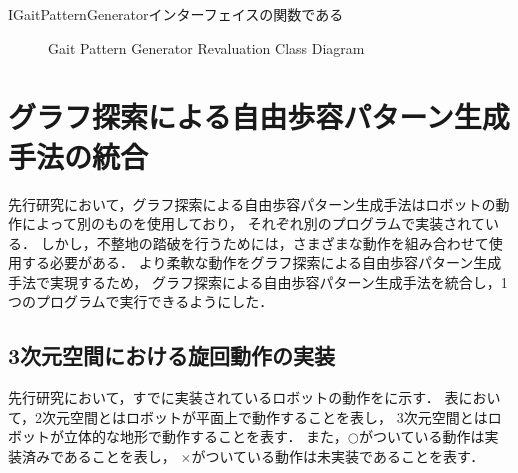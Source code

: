 IGaitPatternGeneratorインターフェイスの関数である
\begin{figure}[htbp]
  \centering
  \caption{Gait Pattern Generator Revaluation Class Diagram}
  \label{fig:gait_pattern_generator_revaluation}  %
\end{figure}

\section{グラフ探索による自由歩容パターン生成手法の統合}
先行研究において，グラフ探索による自由歩容パターン生成手法はロボットの動作によって別のものを使用しており，
それぞれ別のプログラムで実装されている．
しかし，不整地の踏破を行うためには，さまざまな動作を組み合わせて使用する必要がある．
より柔軟な動作をグラフ探索による自由歩容パターン生成手法で実現するため，
グラフ探索による自由歩容パターン生成手法を統合し，1つのプログラムで実行できるようにした．

\subsection{3次元空間における旋回動作の実装}
先行研究において，すでに実装されているロボットの動作をに示す．
表において，2次元空間とはロボットが平面上で動作することを表し，
3次元空間とはロボットが立体的な地形で動作することを表す．
また，$\bigcirc$がついている動作は実装済みであることを表し，
$\times$がついている動作は未実装であることを表す．


